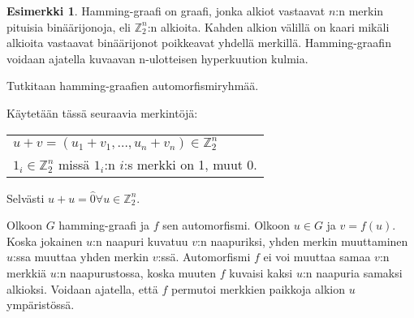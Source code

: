 \documentclass[a4paper, 12pt]{article}
\theoremstyle{definition}
\newtheorem{example}[mydef]{Esimerkki}
\theoremstyle{plain}
\begin{document}
\begin{example}
Hamming-graafi on graafi, jonka alkiot vastaavat $n$:n merkin pituisia binäärijonoja, eli $\mathbb{Z}_2^n$:n alkioita. Kahden alkion välillä on kaari mikäli alkioita vastaavat binäärijonot poikkeavat yhdellä merkillä. Hamming-graafin voidaan ajatella kuvaavan n-ulotteisen hyperkuution kulmia.

\begin{center}
\end{center}

Tutkitaan hamming-graafien automorfismiryhmää.

Käytetään tässä seuraavia merkintöjä:
\begin{center}
\begin{tabular}{l}
$u + v = (u_1 + v_1, \dots, u_n + v_n) \in \mathbb{Z}_2^n$\\
$1_i \in \mathbb{Z}_2^n$ missä $1_i$:n $i$:s merkki on 1, muut 0.
\end{tabular}
\end{center}
Selvästi $u + u = \hat{0} \forall u \in \mathbb{Z}_2^n$.

Olkoon $G$ hamming-graafi ja $f$ sen automorfismi. Olkoon $u \in G$ ja $v = f(u)$. Koska jokainen $u$:n naapuri kuvatuu $v$:n naapuriksi, yhden merkin muuttaminen $u$:ssa muuttaa yhden merkin $v$:ssä. Automorfismi $f$ ei voi muuttaa samaa $v$:n merkkiä $u$:n naapurustossa, koska muuten $f$ kuvaisi kaksi $u$:n naapuria samaksi alkioksi. Voidaan ajatella, että $f$ permutoi merkkien paikkoja alkion $u$ ympäristössä. 


\end{example}
\end{document}

